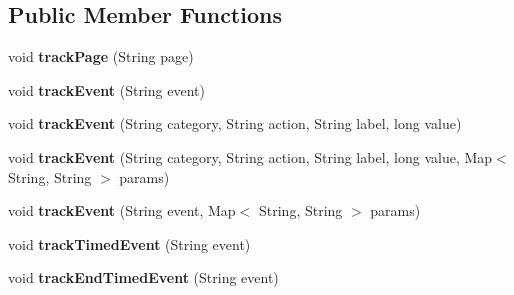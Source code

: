 \subsection*{Public Member Functions}
\begin{DoxyCompactItemize}
\item 
\hypertarget{interfacecom_1_1spilgames_1_1framework_1_1tracking_1_1_spil_tracker_a90e3126a25d90f37e2a28a2f84614e4e}{void {\bfseries track\-Page} (String page)}\label{interfacecom_1_1spilgames_1_1framework_1_1tracking_1_1_spil_tracker_a90e3126a25d90f37e2a28a2f84614e4e}

\item 
\hypertarget{interfacecom_1_1spilgames_1_1framework_1_1tracking_1_1_spil_tracker_a08e853a0745b4f560d4d4602dccc7f1e}{void {\bfseries track\-Event} (String event)}\label{interfacecom_1_1spilgames_1_1framework_1_1tracking_1_1_spil_tracker_a08e853a0745b4f560d4d4602dccc7f1e}

\item 
\hypertarget{interfacecom_1_1spilgames_1_1framework_1_1tracking_1_1_spil_tracker_a75c79d2cccef52507e8fcbb87c901c72}{void {\bfseries track\-Event} (String category, String action, String label, long value)}\label{interfacecom_1_1spilgames_1_1framework_1_1tracking_1_1_spil_tracker_a75c79d2cccef52507e8fcbb87c901c72}

\item 
\hypertarget{interfacecom_1_1spilgames_1_1framework_1_1tracking_1_1_spil_tracker_a22b7c0f7672e7fae826a0ac35019e2a9}{void {\bfseries track\-Event} (String category, String action, String label, long value, Map$<$ String, String $>$ params)}\label{interfacecom_1_1spilgames_1_1framework_1_1tracking_1_1_spil_tracker_a22b7c0f7672e7fae826a0ac35019e2a9}

\item 
\hypertarget{interfacecom_1_1spilgames_1_1framework_1_1tracking_1_1_spil_tracker_a53bb2b3b188c68a5833eb29f1aa6b44b}{void {\bfseries track\-Event} (String event, Map$<$ String, String $>$ params)}\label{interfacecom_1_1spilgames_1_1framework_1_1tracking_1_1_spil_tracker_a53bb2b3b188c68a5833eb29f1aa6b44b}

\item 
\hypertarget{interfacecom_1_1spilgames_1_1framework_1_1tracking_1_1_spil_tracker_a210d654966324e4d56cb0d00d1cee93f}{void {\bfseries track\-Timed\-Event} (String event)}\label{interfacecom_1_1spilgames_1_1framework_1_1tracking_1_1_spil_tracker_a210d654966324e4d56cb0d00d1cee93f}

\item 
\hypertarget{interfacecom_1_1spilgames_1_1framework_1_1tracking_1_1_spil_tracker_a7d567e66629c50aabad6e93be56d0eb2}{void {\bfseries track\-End\-Timed\-Event} (String event)}\label{interfacecom_1_1spilgames_1_1framework_1_1tracking_1_1_spil_tracker_a7d567e66629c50aabad6e93be56d0eb2}


\end{DoxyCompactItemize}
